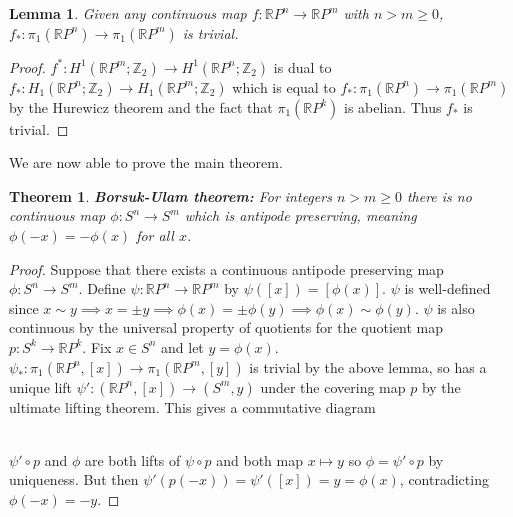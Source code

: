 \documentclass{report}
\newtheorem{lemma}{Lemma}
\newtheorem{theorem}{Theorem}
\begin{document}
\begin{lemma}
Given any continuous map $f\colon\mathbb{R}P^n\to \mathbb{R}P^m$ with $n>m\geq 0$, $f_*\colon\pi_1(\mathbb{R}P^n)\to \pi_1(\mathbb{R}P^m)$ is trivial.
\end{lemma}
\begin{proof}
 $f^*\colon H^1(\mathbb{R}P^m;\mathbb{Z}_2)\rightarrow H^1(\mathbb{R}P^n;\mathbb{Z}_2)$ is dual to $f_*\colon H_1(\mathbb{R}P^n;\mathbb{Z}_2)\rightarrow H_1(\mathbb{R}P^m;\mathbb{Z}_2)$ which is equal to $f_*\colon \pi_1(\mathbb{R}P^n)\rightarrow \pi_1(\mathbb{R}P^m)$ by the Hurewicz theorem and the fact that $\pi_1(\mathbb{R}P^k)$ is abelian. Thus $f_*$ is trivial.
\end{proof}

\noindent We are now able to prove the main theorem.
\begin{theorem}
\textbf{Borsuk-Ulam theorem:} For integers $n>m\geq 0$ there is no continuous map $\phi\colon S^n\to S^m$ which is antipode preserving, meaning $\phi(-x)=-\phi(x)$ for all $x$.
\end{theorem}
\begin{proof}
Suppose that there exists a continuous antipode preserving map $\phi:S^n\rightarrow S^m$. Define $\psi\colon\mathbb{R}P^n\to \mathbb{R}P^m$ by $\psi([x])=[\phi(x)]$. $\psi$ is well-defined since $x\sim y \implies x=\pm y \implies \phi(x)=\pm\phi(y) \implies \phi(x)\sim\phi(y)$. $\psi$ is also continuous by the universal property of quotients for the quotient map $p:S^k\rightarrow \mathbb{R}P^k$.
Fix $x\in S^n$ and let $y=\phi(x)$. $\psi_*\colon\pi_1(\mathbb{R}P^n,[x])\to \pi_1(\mathbb{R}P^m,[y])$ is trivial by the above lemma, so has a unique lift $\psi'\colon(\mathbb{R}P^n,[x])\to (S^m,y)$ under the covering map $p$ by the ultimate lifting theorem. This gives a commutative diagram

\\
$\psi' \circ p$ and $\phi$ are both lifts of $\psi \circ p$ and both map $x\mapsto y$ so $\phi = \psi'\circ p$ by uniqueness. But then $\psi'(p(-x))=\psi'([x])=y=\phi(x)$, contradicting $\phi(-x)=-y$.
\end{proof}
\end{document}
